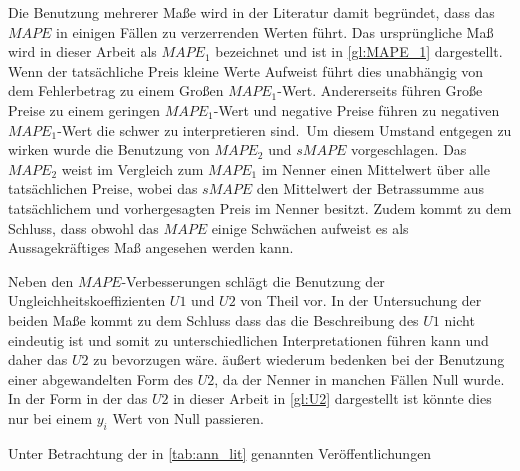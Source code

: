 Die Benutzung mehrerer Maße wird in der Literatur damit begründet, dass das $MAPE$ in einigen Fällen zu verzerrenden Werten führt. Das ursprüngliche Maß wird in dieser Arbeit als $MAPE_1$ bezeichnet und ist in \autoref{gl:MAPE_1} dargestellt. Wenn der tatsächliche Preis kleine Werte Aufweist führt dies unabhängig von dem Fehlerbetrag zu einem Großen $MAPE_1$-Wert. Andererseits führen Große Preise zu einem geringen $MAPE_1$-Wert und negative Preise führen zu negativen $MAPE_1$-Wert die schwer zu interpretieren sind.\, Um diesem Umstand entgegen zu wirken wurde die Benutzung von $MAPE_2$ und $sMAPE$ vorgeschlagen. Das $MAPE_2$ weist im Vergleich zum $MAPE_1$ im Nenner einen Mittelwert über alle tatsächlichen Preise, wobei das $sMAPE$ den Mittelwert der Betrassumme aus tatsächlichem und vorhergesagten Preis im Nenner besitzt. Zudem kommt \citet{Makridakis1993} zu dem Schluss, dass obwohl das $MAPE$ einige Schwächen aufweist es als Aussagekräftiges Maß angesehen werden kann.

Neben den $MAPE$-Verbesserungen schlägt \citet{Panapakidis2016} die Benutzung der Ungleichheitskoeffizienten $U1$ und $U2$ von Theil vor. In der Untersuchung der beiden Maße kommt \citet{Bliemel1973} zu dem Schluss dass das die Beschreibung des $U1$ nicht eindeutig ist und somit zu unterschiedlichen Interpretationen führen kann und daher das $U2$ zu bevorzugen wäre. \citet{Makridakis1993} äußert wiederum bedenken bei der Benutzung einer abgewandelten Form des $U2$, da der Nenner in manchen Fällen Null wurde. In der Form in der das $U2$ in dieser Arbeit in \autoref{gl:U2} dargestellt ist könnte dies nur bei einem $y_i$ Wert von Null passieren.

Unter Betrachtung der in \autoref{tab:ann_lit} genannten Veröffentlichungen 